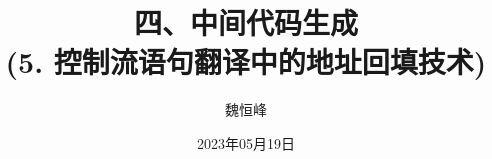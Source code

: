 \documentclass[]{beamer}
\title[中间代码生成]{四、中间代码生成 \\ (5. 控制流语句翻译中的地址回填技术)}
\author[魏恒峰]{\large 魏恒峰}
\institute{hfwei@nju.edu.cn}
\date{2023年05月19日}
\begin{document}
\maketitle




\thankyou{}

\end{document}
